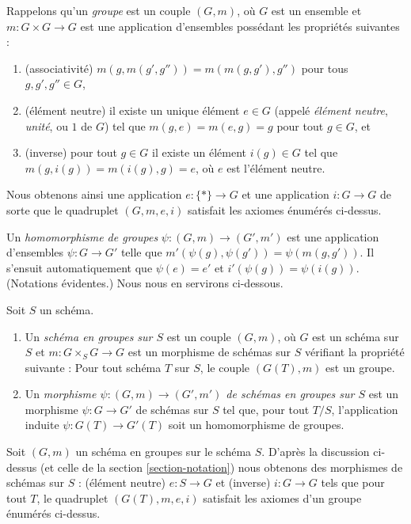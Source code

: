 \noindent
Rappelons qu'un {\it groupe} est un couple
$(G, m)$, où $G$ est un ensemble et $m : G \times G \to G$ est
une application d'ensembles possédant les propriétés suivantes :
\begin{enumerate}
\item (associativité) $m(g, m(g', g'')) = m(m(g, g'), g'')$
pour tous $g, g', g'' \in G$,
\item (élément neutre) il existe un unique élément $e \in G$
(appelé {\it élément neutre}, {\it unité}, ou $1$ de $G$) tel que
$m(g, e) = m(e, g) = g$ pour tout $g \in G$, et
\item (inverse) pour tout $g \in G$ il existe un élément $i(g) \in G$
tel que $m(g, i(g)) = m(i(g), g) = e$, où $e$ est
l'élément neutre.
\end{enumerate}
Nous obtenons ainsi une application $e : \{*\} \to G$ et une application
$i : G \to G$ de sorte que le quadruplet $(G, m, e, i)$
satisfait les axiomes énumérés ci-dessus.

\medskip\noindent
Un {\it homomorphisme de groupes} $\psi : (G, m) \to (G', m')$
est une application d'ensembles $\psi : G \to G'$ telle que
$m'(\psi(g), \psi(g')) = \psi(m(g, g'))$. Il s'ensuit automatiquement
que $\psi(e) = e'$ et $i'(\psi(g)) = \psi(i(g))$.
(Notations évidentes.) Nous nous en servirons ci-dessous.

\begin{definition}
\label{definition-group-scheme}
Soit $S$ un schéma.
\begin{enumerate}
\item Un {\it schéma en groupes sur $S$} est un couple $(G, m)$, où
$G$ est un schéma sur $S$ et $m : G \times_S G \to G$ est
un morphisme de schémas sur $S$ vérifiant la propriété suivante :
Pour tout schéma $T$ sur $S$, le couple $(G(T), m)$
est un groupe.
\item Un {\it morphisme $\psi : (G, m) \to (G', m')$ de schémas en groupes sur $S$}
est un morphisme $\psi : G \to G'$ de schémas sur $S$ tel que, pour
tout $T/S$, l'application induite $\psi : G(T) \to G'(T)$ soit un homomorphisme
de groupes.
\end{enumerate}
\end{definition}

\noindent
Soit $(G, m)$ un schéma en groupes sur le schéma $S$.
D'après la discussion ci-dessus (et celle de la section \ref{section-notation})
nous obtenons des morphismes de schémas sur $S$ :
(élément neutre) $e : S \to G$ et (inverse) $i : G \to G$ tels que
pour tout $T$, le quadruplet $(G(T), m, e, i)$ satisfait les
axiomes d'un groupe énumérés ci-dessus.

